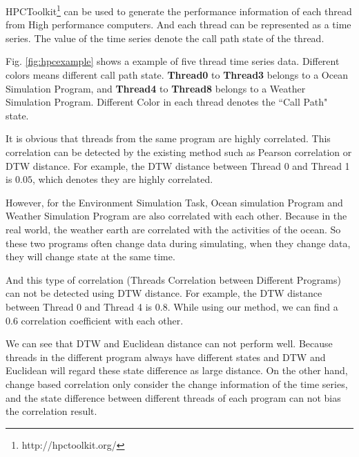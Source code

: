 HPCToolkit\footnote{http://hpctoolkit.org/} can be used to generate the performance information of each thread from High performance computers. 
And each thread can be represented as a time series. The value of the time series denote the call path \cite{adhianto2010hpctoolkit} state of the thread.


Fig. \ref{fig:hpcexample} shows a example of five thread time series data. Different colors means different call path state. 
\textbf{Thread0} to \textbf{Thread3} belongs to a Ocean Simulation Program, and \textbf{Thread4} to \textbf{Thread8} belongs to a Weather Simulation Program. Different Color in each thread denotes the ``Call Path" state.

It is obvious that threads from the same program are highly correlated. This correlation can be detected by the existing method such as Pearson correlation or DTW distance. For example, the DTW distance between Thread 0 and Thread 1 is $0.05$, which denotes they are highly correlated.

However, for the Environment Simulation Task, Ocean simulation Program and Weather Simulation Program are also correlated with each other. Because in the real world, the weather earth are correlated with the activities of the ocean.  So these two programs often change data during simulating, when they change data, they will change state at the same time.

And this type of correlation (Threads Correlation between Different Programs) can not be detected using DTW distance. For example, the DTW distance between Thread 0 and Thread 4 is $0.8$. While using our method, we can find a $0.6$ correlation coefficient with each other.

We can see that DTW and Euclidean distance can not perform well. Because threads in the different program always have different states and DTW and Euclidean will regard these state difference as large distance.
On the other hand, change based correlation only consider the change information of the time series, and the state difference between different threads of each program can not bias the correlation result.



